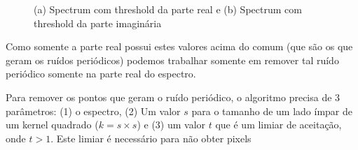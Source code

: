 \documentclass{article}
\begin{document}
	\begin{figure}[H]
		\centering
		\qquad
		\caption{(a) Spectrum com threshold da parte real e (b) Spectrum com threshold da parte imaginária} 
	\end{figure}
	
	Como somente a parte real possui estes valores acima do comum (que são os que geram os ruídos periódicos) podemos trabalhar somente em remover tal ruído periódico somente na parte real do espectro.
	
	Para remover os pontos que geram o ruído periódico, o algoritmo precisa de 3 parâmetros: (1) o espectro, (2) Um valor $s$ para o tamanho de um lado ímpar de um kernel quadrado ($k = s\times s$) e (3) um valor $t$ que é um limiar de aceitação, onde $t > 1$. Este limiar é necessário para não obter pixels  
	
\end{document}
